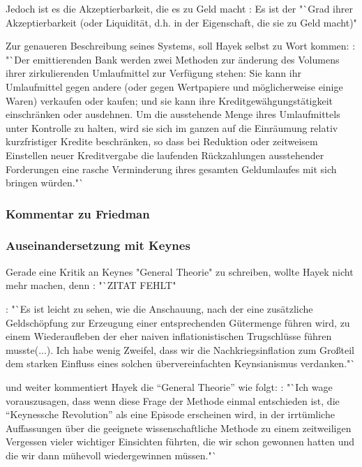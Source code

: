 \documentclass[
onecolumn,
a4paper,
abstracton,
parskip=half
,final
]{scrartcl}
\begin{document}
Jedoch ist es die Akzeptierbarkeit, die es zu Geld macht \citep[vgl.][S.40]{Hayek1977}: Es ist der "`Grad ihrer Akzeptierbarkeit (oder Liquidit{\"a}t, d.h. in der Eigenschaft, die sie zu Geld macht)"

Zur genaueren Beschreibung seines Systems, soll Hayek selbst zu Wort kommen: \citep[vgl.][S.45]{Hayek1977}: "`Der emittierenden Bank werden zwei Methoden zur {\"a}nderung des Volumens ihrer zirkulierenden Umlaufmittel zur Verf{\"u}gung stehen: Sie kann ihr Umlaufmittel gegen andere (oder gegen Wertpapiere und m{\"o}glicherweise einige Waren) verkaufen oder kaufen; und sie kann ihre Kreditgew{\"a}hgungst{\"a}tigkeit einschr{\"a}nken oder ausdehnen. Um die ausstehende Menge ihres Umlaufmittels unter Kontrolle zu halten, wird sie sich im ganzen auf die Einr{\"a}umung relativ kurzfristiger Kredite beschr{\"a}nken, so dass bei Reduktion oder zeitweisem Einstellen neuer Kreditvergabe die laufenden R{\"u}ckzahlungen ausstehender Forderungen eine rasche Verminderung ihres gesamten Geldumlaufes mit sich bringen w{\"u}rden."`

\subsubsection{Kommentar zu Friedman}

\subsubsection{Auseinandersetzung mit Keynes}
Gerade eine Kritik an Keynes "General Theorie" zu schreiben, wollte Hayek nicht mehr machen, denn \citep[vgl.][S.91]{Hayek1969}: "`ZITAT FEHLT"

\citep[vgl.][S.93]{Hayek1969}: "`Es ist leicht zu sehen, wie die Anschauung, nach der eine zus{\"a}tzliche Geldsch{\"o}pfung zur Erzeugung einer entsprechenden G{\"u}termenge f{\"u}hren wird, zu einem Wiederaufleben der eher naiven inflationistischen Trugschl{\"u}sse f{\"u}hren musste(...). Ich habe wenig Zweifel, dass wir die Nachkriegsinflation zum Gro{\ss}teil dem starken Einfluss eines solchen {\"u}bervereinfachten Keynsianismus verdanken."`

und weiter kommentiert Hayek die "`General Theorie"' wie folgt:
\citep[vgl.][S.96]{Hayek1969}: "`Ich wage vorauszusagen, dass wenn diese Frage der Methode einmal entschieden ist, die "`Keynessche Revolution"' als eine Episode erscheinen wird, in der irrt{\"u}mliche Auffassungen {\"u}ber die geeignete wissenschaftliche Methode zu einem zeitweiligen Vergessen vieler wichtiger Einsichten f{\"u}hrten, die wir schon gewonnen hatten und die wir dann m{\"u}hevoll wiedergewinnen m{\"u}ssen."`
\end{document}
